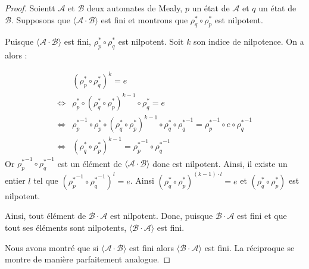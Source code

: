 \documentclass{article}
\begin{document}
\begin{proof}
	Soientt $\mathcal{A}$ et $\mathcal{B}$ deux automates de Mealy, $p$ un état de $\mathcal{A}$ et $q$ un état de $\mathcal{B}$. Supposons que $\langle \mathcal{A} \cdot \mathcal{B} \rangle$ est fini et montrons que $\rho^*_q \circ \rho^*_p$ est nilpotent. 
	
	Puisque $\langle \mathcal{A} \cdot \mathcal{B} \rangle$ est fini, $\rho^*_p \circ \rho^*_q$ est nilpotent. Soit $k$ son indice de nilpotence. On a alors :
	
	\begin{equation*} \label{eq1}
	\begin{split}
		& (\rho^*_p \circ \rho^*_q)^k = e \\
	 \Longleftrightarrow {}&\rho^*_p \circ (\rho^*_q \circ \rho^*_p)^{k-1} \circ \rho^*_q  = e \\
	 \Longleftrightarrow {}& {\rho^*_p}^{-1} \circ \rho^*_p \circ (\rho^*_q \circ \rho^*_p)^{k-1} \circ \rho^*_q \circ {\rho^*_q}^{-1} = {\rho^*_p}^{-1} \circ e \circ {\rho^*_q}^{-1} \\
	 \Longleftrightarrow {}& (\rho^*_q \circ \rho^*_p)^{k-1} = {\rho^*_p}^{-1} \circ {\rho^*_q}^{-1}
	\end{split}
	\end{equation*}
	Or ${\rho^*_p}^{-1} \circ {\rho^*_q}^{-1}$ est un élément de $\langle \mathcal{A} \cdot \mathcal{B} \rangle$ donc est nilpotent. Ainsi, il existe un entier $l$ tel que $({\rho^*_p}^{-1} \circ {\rho^*_q}^{-1})^l = e$. Ainsi $(\rho^*_q \circ \rho^*_p)^{(k-1) \cdot l} = e$ et $(\rho^*_q \circ \rho^*_p)$ est nilpotent.
	
	Ainsi, tout élément de $\mathcal{B} \cdot \mathcal{A}$ est nilpotent. Donc, puisque $\mathcal{B} \cdot \mathcal{A}$ est fini et que tout ses éléments sont nilpotents, $\langle \mathcal{B} \cdot \mathcal{A} \rangle$ est fini.
	
	Nous avons montré que si $\langle \mathcal{A} \cdot \mathcal{B} \rangle$ est fini alors $\langle \mathcal{B} \cdot \mathcal{A} \rangle$ est fini. La réciproque se montre de manière parfaitement analogue.
\end{proof}
\end{document}

